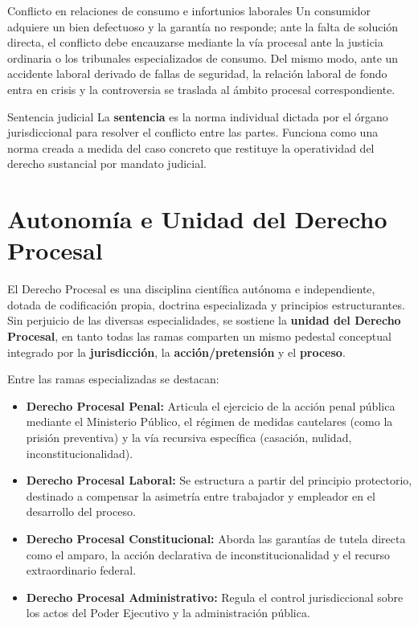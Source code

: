 \documentclass[12pt,oneside]{book}
\begin{document}
\begin{example}{Conflicto en relaciones de consumo e infortunios laborales}
Un consumidor adquiere un bien defectuoso y la garantía no responde; ante la falta de solución directa, el conflicto debe encauzarse mediante la vía procesal ante la justicia ordinaria o los tribunales especializados de consumo. Del mismo modo, ante un accidente laboral derivado de fallas de seguridad, la relación laboral de fondo entra en crisis y la controversia se traslada al ámbito procesal correspondiente.
\end{example}

\begin{definition}{Sentencia judicial}
La \textbf{sentencia} es la norma individual dictada por el órgano jurisdiccional para resolver el conflicto entre las partes. Funciona como una norma creada a medida del caso concreto que restituye la operatividad del derecho sustancial por mandato judicial.
\end{definition}

\section{Autonomía e Unidad del Derecho Procesal}
El Derecho Procesal es una disciplina científica autónoma e independiente, dotada de codificación propia, doctrina especializada y principios estructurantes. Sin perjuicio de las diversas especialidades, se sostiene la \textbf{unidad del Derecho Procesal}, en tanto todas las ramas comparten un mismo pedestal conceptual integrado por la \textbf{jurisdicción}, la \textbf{acción/pretensión} y el \textbf{proceso}.

Entre las ramas especializadas se destacan:
\begin{itemize}
    \item \textbf{Derecho Procesal Penal:} Articula el ejercicio de la acción penal pública mediante el Ministerio Público, el régimen de medidas cautelares (como la prisión preventiva) y la vía recursiva específica (casación, nulidad, inconstitucionalidad).
    \item \textbf{Derecho Procesal Laboral:} Se estructura a partir del principio protectorio, destinado a compensar la asimetría entre trabajador y empleador en el desarrollo del proceso.
    \item \textbf{Derecho Procesal Constitucional:} Aborda las garantías de tutela directa como el amparo, la acción declarativa de inconstitucionalidad y el recurso extraordinario federal.
    \item \textbf{Derecho Procesal Administrativo:} Regula el control jurisdiccional sobre los actos del Poder Ejecutivo y la administración pública.
\end{itemize}
\end{document}
